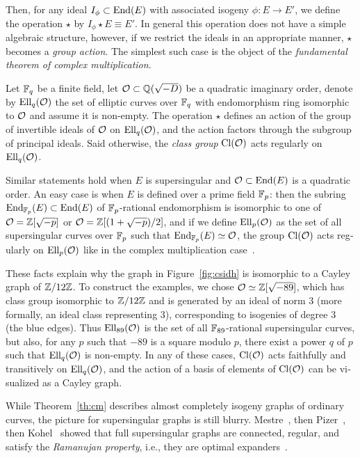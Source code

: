 \begin{otherlanguage}{english}
  Then, for any ideal $I_\phi\subset\mathrm{End}(E)$ with associated isogeny
  $\phi:E\to E'$, we define the operation $\star$ by
  $I_\phi\star E \equiv E'$. In general this operation does not have a
  simple algebraic structure, however, if we restrict the ideals in an
  appropriate manner, $\star$ becomes a \emph{group action}. The
  simplest such case is the object of the \emph{fundamental theorem of
    complex multiplication}.

  \begin{theorem}
    \label{th:cm}
    Let $\mathbb{F}_q$ be a finite field, let $\mathcal{O}\subset\mathbb{Q}(\sqrt{-D})$ be a
    quadratic imaginary order, denote by $\mathrm{Ell}_q(\mathcal{O})$ the set of
    elliptic curves over $\mathbb{F}_q$ with endomorphism ring isomorphic to
    $\mathcal{O}$ and assume it is non-empty. The operation $\star$ defines an
    action of the group of invertible ideals of $\mathcal{O}$ on $\mathrm{Ell}_q(\mathcal{O})$,
    and the action factors through the subgroup of principal
    ideals. Said otherwise, the \emph{class group} $\mathrm{Cl}(\mathcal{O})$ acts
    regularly on $\mathrm{Ell}_q(\mathcal{O})$.
  \end{theorem}

  Similar statements hold when $E$ is supersingular and
  $\mathcal{O}\subset\mathrm{End}(E)$ is a quadratic order. An easy case is when $E$ is
  defined over a prime field $\mathbb{F}_p$: then the subring
  $\mathrm{End}_{\mathbb{F}_p}(E)\subset\mathrm{End}(E)$ of $\mathbb{F}_p$-rational endomorphism is
  isomorphic to one of $\mathcal{O}=\mathbb{Z}[\sqrt{-p}]$ or $\mathcal{O}=\mathbb{Z}[(1+\sqrt{-p})/2]$,
  and if we define $\mathrm{Ell}_p(\mathcal{O})$ as the set of all supersingular curves
  over $\mathbb{F}_p$ such that $\mathrm{End}_{\mathbb{F}_p}(E)\simeq\mathcal{O}$, the group $\mathrm{Cl}(\mathcal{O})$
  acts regularly on $\mathrm{Ell}_p(\mathcal{O})$ like in the complex multiplication
  case~\cite{Delfs2016}.

  These facts explain why the graph in Figure~\ref{fig:csidh} is
  isomorphic to a Cayley graph of $\mathbb{Z}/12\mathbb{Z}$. To construct the
  examples, we chose $\mathcal{O}\simeq\mathbb{Z}[\sqrt{-89}]$, which has class group
  isomorphic to $\mathbb{Z}/12\mathbb{Z}$ and is generated by an ideal of norm $3$
  (more formally, an ideal class representing $3$), corresponding to
  isogenies of degree $3$ (the blue edges). Thus $\mathrm{Ell}_{89}(\mathcal{O})$ is
  the set of all $\mathbb{F}_{89}$-rational supersingular curves, but also,
  for any $p$ such that $-89$ is a square modulo $p$, there exist a
  power $q$ of $p$ such that $\mathrm{Ell}_q(\mathcal{O})$ is non-empty. In any of
  these cases, $\mathrm{Cl}(\mathcal{O})$ acts faithfully and transitively on
  $\mathrm{Ell}_q(\mathcal{O})$, and the action of a basis of elements of $\mathrm{Cl}(\mathcal{O})$ can
  be visualized as a Cayley graph.

  While Theorem~\ref{th:cm} describes almost completely isogeny graphs
  of ordinary curves, the picture for supersingular graphs is still
  blurry. Mestre~\cite{mestre86}, then Pizer~\cite{pizer1,pizer2},
  then Kohel~\cite{kohel} showed that full supersingular graphs are
  connected, regular, and satisfy the \emph{Ramanujan property}, i.e.,
  they are optimal expanders~\cite{}.


\end{otherlanguage}
